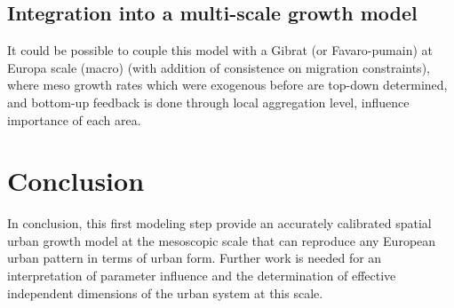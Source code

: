 \documentclass[10pt,letterpaper,draft]{article}
\begin{document}







\subsection*{Integration into a multi-scale growth model}

It could be possible to couple this model with a Gibrat (or Favaro-pumain) at Europa scale (macro) (with addition of consistence on migration constraints), where meso growth rates which were exogenous before are top-down determined, and bottom-up feedback is done through local aggregation level, influence importance of each area.


\cite{zhang2013identifying}






\section*{Conclusion}


In conclusion, this first modeling step provide an accurately calibrated spatial urban growth model at the mesoscopic scale that can reproduce any European urban pattern in terms of urban form. Further work is needed for an interpretation of parameter influence and the determination of effective independent dimensions of the urban system at this scale.





\end{document}
